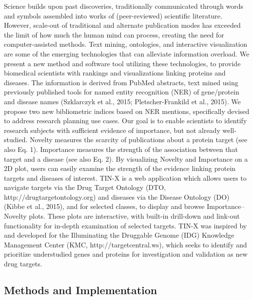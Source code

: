 Science builds upon past discoveries, traditionally communicated through words and symbols assembled into works of (peer-reviewed) scientific literature. However, scale-out of traditional and alternate publication modes has exceeded the limit of how much the human mind can process, creating the need for computer-assisted methods. Text mining, ontologies, and interactive visualization are some of the emerging technologies that can alleviate information overload. We present a new method and software tool utilizing these technologies, to provide biomedical scientists with rankings and visualizations linking proteins and diseases.  The information is derived from PubMed abstracts, text mined using previously published tools for named entity recognition (NER) of gene/protein and disease names (Szklarczyk et al., 2015; Pletscher-Frankild et al., 2015). We propose two new bibliometric indices based on NER mentions, specifically devised to address research planning use cases. Our goal is to enable scientists to identify research subjects with sufficient evidence of importance, but not already well-studied. Novelty measures the scarcity of publications about a protein target (see also Eq. 1). Importance measures the strength of the association between that target and a disease (see also Eq. 2). By visualizing Novelty and Importance on a 2D plot, users can easily examine the strength of the evidence linking protein targets and diseases of interest. TIN-X is a web application which allows users to navigate targets via the Drug Target Ontology (DTO, http://drugtargetontology.org) and diseases via the Disease Ontology (DO) (Kibbe et al., 2015), and for selected classes, to display and browse Importance–Novelty plots. These plots are interactive, with built-in drill-down and link-out functionality for in-depth examination of selected targets. TIN-X was inspired by and developed for the Illuminating the Druggable Genome (IDG) Knowledge Management Center (KMC, http://targetcentral.ws), which seeks to identify and prioritize understudied genes and proteins for investigation and validation as new drug targets.

\subsection{Methods and Implementation}

